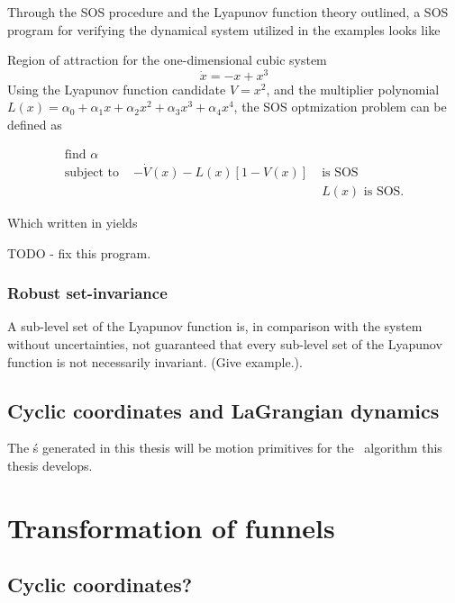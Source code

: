 Through the \ac{SOS} procedure and the Lyapunov function theory
outlined, a \ac{SOS} program for verifying the dynamical system utilized in the
examples looks like
\begin{example}{Region of attraction for the one-dimensional cubic system}
  \[
    \dot{x} = -x + x^3
  \] 
Using the Lyapunov function candidate \(V = x^2\), and the multiplier polynomial
\(L(x) = \alpha_0 + \alpha_1x + \alpha_2x^2 + \alpha_3x^3 + \alpha_4x^4\), the
\ac{SOS} optmization problem can be defined as

\begin{align*}
  \text{find } \alpha& \\
  \text{subject to }& -\dot{V}(x) - L(x)\left[ 1 - V(x) \right] \; &\text{is SOS} \\
  & &L(x) \text{ is SOS}.
\end{align*}

Which written in \cite[Yalmip]{Lofberg2004,Lofberg2009} yields


TODO - fix this program.
\end{example}

\subsubsection{Robust set-invariance}

A sub-level set of the Lyapunov function is, in comparison with the system
without uncertainties, not guaranteed that every sub-level set of the Lyapunov
function is not necessarily invariant. (Give example.).

\subsection{Cyclic coordinates and LaGrangian dynamics}

The \funnel\'s generated in this thesis will be motion primitives for the
\rrtfunnel\ algorithm this thesis develops.


\section{Transformation of funnels}

\subsection{Cyclic coordinates?}

